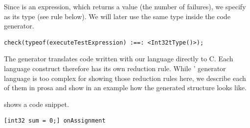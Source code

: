Since  is an expression, which returns a value (the
number of failures), we specify  as its type (see rule below). We
will later use the same type inside the code generator.
\begin{lstlisting}[language=mbeddr,frame=single]
check(typeof(executeTestExpression) :==: <Int32tType()>);
\end{lstlisting}



The generator translates code written with our language directly to C. Each
language construct therefore has its own reduction rule. While '
generator language is too complex for showing those reduction rules here, we
describe each of them in prosa and show in an example how the generated
structure looks like.

  shows a code
snippet.

\begin{lstlisting}[language=reducedMbeddr]
	[int32 sum = 0;] onAssignment
\end{lstlisting}

